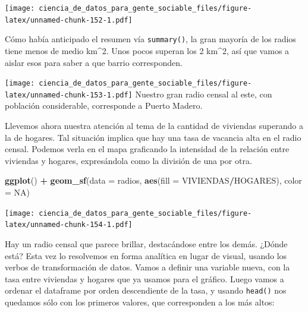 \documentclass[spanish,]{book}
\newenvironment{Shaded}{\begin{snugshade}}{\end{snugshade}}
\newcommand{\DataTypeTok}[1]{\textcolor[rgb]{0.13,0.29,0.53}{#1}}
\newcommand{\DecValTok}[1]{\textcolor[rgb]{0.00,0.00,0.81}{#1}}
\newcommand{\KeywordTok}[1]{\textcolor[rgb]{0.13,0.29,0.53}{\textbf{#1}}}
\newcommand{\NormalTok}[1]{#1}
\newcommand{\OperatorTok}[1]{\textcolor[rgb]{0.81,0.36,0.00}{\textbf{#1}}}
\newcommand{\OtherTok}[1]{\textcolor[rgb]{0.56,0.35,0.01}{#1}}
\newcommand{\StringTok}[1]{\textcolor[rgb]{0.31,0.60,0.02}{#1}}
\begin{document}
\texttt{[image: ciencia\_de\_datos\_para\_gente\_sociable\_files/figure-latex/unnamed-chunk-152-1.pdf]}

Cómo había anticipado el resumen vía \texttt{summary()}, la gran mayoría de los radios tiene menos de medio km\^{}2. Unos pocos superan los 2 km\^{}2, así que vamos a aislar esos para saber a que barrio corresponden.

\begin{Shaded}
\end{Shaded}

\texttt{[image: ciencia\_de\_datos\_para\_gente\_sociable\_files/figure-latex/unnamed-chunk-153-1.pdf]}
Nuestro gran radio censal al este, con población considerable, corresponde a Puerto Madero.

Llevemos ahora nuestra atención al tema de la cantidad de viviendas superando a la de hogares. Tal situación implica que hay una tasa de vacancia alta en el radio censal. Podemos verla en el mapa graficando la intensidad de la relación entre viviendas y hogares, expresándola como la división de una por otra.

\begin{Shaded}
\begin{Highlighting}[]
\KeywordTok{ggplot}\NormalTok{() }\OperatorTok{+}\StringTok{ }\KeywordTok{geom_sf}\NormalTok{(}\DataTypeTok{data =}\NormalTok{ radios, }\KeywordTok{aes}\NormalTok{(}\DataTypeTok{fill =}\NormalTok{ VIVIENDAS}\OperatorTok{/}\NormalTok{HOGARES), }\DataTypeTok{color =} \OtherTok{NA}\NormalTok{)}
\end{Highlighting}
\end{Shaded}

\texttt{[image: ciencia\_de\_datos\_para\_gente\_sociable\_files/figure-latex/unnamed-chunk-154-1.pdf]}

Hay un radio censal que parece brillar, destacándose entre los demás. ¿Dónde está? Esta vez lo resolvemos en forma analítica en lugar de visual, usando los verbos de transformación de datos. Vamos a definir una variable nueva, con la tasa entre viviendas y hogares que ya usamos para el gráfico. Luego vamos a ordenar el dataframe por orden descendiente de la tasa, y usando \texttt{head()} nos quedamos sólo con los primeros valores, que corresponden a los más altos:
\end{document}
